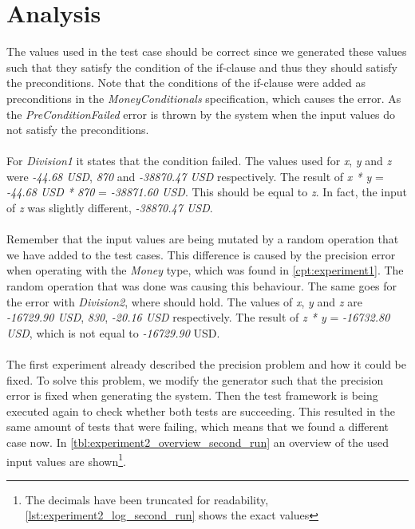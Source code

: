 \section{Analysis}
The values used in the test case should be correct since we generated these
values such that they satisfy the condition of the if-clause and thus they
should satisfy the preconditions. Note that the conditions of the if-clause were
added as preconditions in the \textit{MoneyConditionals} specification, which
causes the error. As the \textit{PreConditionFailed} error is thrown by the
system when the input values do not satisfy the preconditions.\\
\\
For \textit{Division1} it states that the condition  failed. The
values used for \textit{x}, \textit{y} and \textit{z} were \textit{-44.68 USD},
\textit{870} and \textit{-38870.47 USD} respectively. The result of
\textit{x * y} = \textit{-44.68 USD * 870} = \textit{-38871.60 USD}. This should
be equal to \textit{z}. In fact, the input of \textit{z} was slightly different,
\textit{-38870.47 USD}.\\
\\
Remember that the input values are being mutated by a random operation that we
have added to the test cases. This difference is caused by the precision error
when operating with the \textit{Money} type, which was found in
\autoref{cpt:experiment1}. The random operation that was done was causing this
behaviour. The same goes for the error with \textit{Division2}, where
 should hold. The values of \textit{x}, \textit{y} and \textit{z}
are \textit{-16729.90 USD}, \textit{830}, \textit{-20.16 USD} respectively. The
result of \textit{z * y} = \textit{-16732.80 USD}, which is not equal to
\textit{-16729.90} USD.\\
\\
The first experiment already described the precision problem and how it could
be fixed. To solve this problem, we modify the generator such that the precision
error is fixed when generating the system. Then the test framework is being
executed again to check whether both tests are succeeding. This resulted in the
same amount of tests that were failing, which means that we found a different
case now. In \autoref{tbl:experiment2_overview_second_run} an overview of the
used input values are shown\footnote{The decimals have been truncated for
readability, \autoref{lst:experiment2_log_second_run} shows the exact values}.
